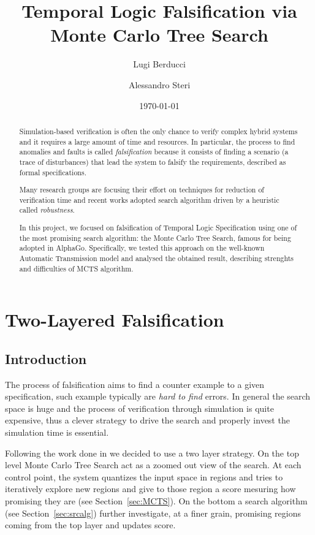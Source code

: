 \documentclass[11pt]{article}
\title{Temporal Logic Falsification via Monte Carlo Tree Search}
\author{Lugi Berducci \and Alessandro Steri}
\date{\today}
\begin{document}
\maketitle	


\begin{abstract}
Simulation-based verification is often the only chance to verify complex hybrid systems and it requires a large amount of time and resources.
In particular, the process to find anomalies and faults is called \textit{falsification} because it consists of finding a scenario (a trace of disturbances) that lead the system to falsify the requirements, described as formal specifications.

Many research groups are focusing their effort on techniques for reduction of verification time and recent works adopted search algorithm driven by a heuristic called \textit{robustness}.

In this project, we focused on falsification of Temporal Logic Specification using one of the most promising search algorithm: the Monte Carlo Tree Search, famous for being adopted in AlphaGo. Specifically, we tested this approach on the well-known Automatic Transmission model and analysed the obtained result, describing strenghts and difficulties of MCTS algorithm.

\end{abstract}

\tableofcontents

\pagebreak

\section{Two-Layered Falsification}
\subsection{Introduction}
The process of falsification aims to find a counter example to a given specification, such example typically are \textit{hard to find}  errors. In general the search space is huge and the process of verification through simulation is quite expensive, thus a clever strategy to drive the search and properly invest the simulation time is essential.

Following the work done in \cite{zhang2018two} we decided to use a two layer strategy. On the top level Monte Carlo Tree Search act as a zoomed out view of the search. At each control point, the system quantizes the input space in regions and tries to iteratively explore new regions and give to those region a score mesuring how promising they are (see Section~\ref{sec:MCTS}). 
On the bottom a search algorithm (see Section~\ref{sec:srcalg}) further investigate, at a finer grain, promising regions  coming from the top layer and updates score.
\end{document}
